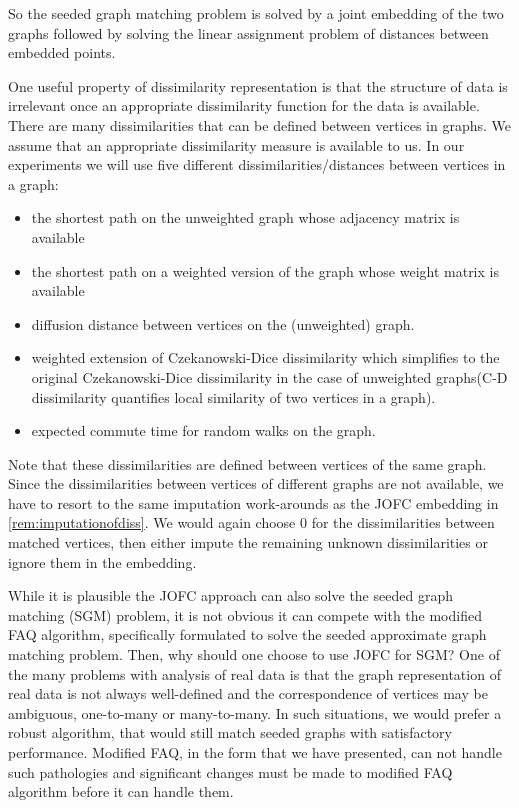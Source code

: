 \documentclass[12pt,oneside,final]{thesis}
\begin{document}
So the seeded graph matching problem is solved by a joint embedding of the two graphs followed by solving the linear assignment problem of distances between embedded points.
 
One useful property of dissimilarity representation is that the structure of data is irrelevant once an appropriate dissimilarity function  for the data is available. 
There are many dissimilarities that can be defined between vertices in graphs. We assume that an appropriate dissimilarity measure is available to us.
In our experiments we will use five different dissimilarities/distances between vertices in a graph:
\begin{itemize}
 \item the shortest path on the  unweighted graph whose adjacency matrix is available
 \item the shortest path on a weighted version of the graph whose weight matrix is available
 \item diffusion distance between vertices on the (unweighted) graph.
 \item weighted extension of Czekanowski-Dice dissimilarity\cite{DICE,weightedDICE} which simplifies to the original Czekanowski-Dice dissimilarity in the case of unweighted graphs(C-D dissimilarity  quantifies local similarity of two vertices in a graph).
 \item expected commute time for random walks on the graph.
 \end{itemize}
 \begin{remark}
 Note that these dissimilarities are defined between vertices of the same graph. Since the dissimilarities between vertices of different graphs are not available, we have to resort to the same imputation work-arounds  as the JOFC embedding in  \ref{rem:imputationofdiss}.
 We would again choose 0 for the dissimilarities between matched vertices, then either impute the remaining unknown dissimilarities or ignore them in the embedding.
 \end{remark}
 
 While it is plausible the JOFC approach can also solve the seeded graph matching (SGM) problem, it is not obvious it can compete with the modified FAQ algorithm, specifically formulated to solve the  seeded approximate graph matching problem. Then, why should one choose to use JOFC for SGM?
One of the many problems with analysis of real data is that the graph representation of real data is 
 not always well-defined and the correspondence of vertices may be  ambiguous, one-to-many or many-to-many. 
In such situations, we would prefer a robust algorithm, that would still match seeded graphs with satisfactory performance. 
Modified FAQ, in the form that we have presented, can not handle such pathologies and significant changes must be made to modified FAQ algorithm before it can handle them. 
\end{document}
